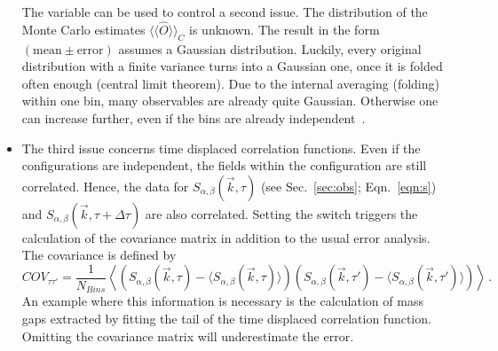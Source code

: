 \begin{itemize}
The  variable can be used to control a second issue. The distribution of the Monte Carlo estimates $\langle\langle\hat{O}\rangle\rangle_C$ is unknown. The result in the form $(\mathrm{mean}\pm \mathrm{error})$ assumes a Gaussian distribution. Luckily, every original distribution with a finite variance turns into a Gaussian one, once it is folded often enough (central limit theorem). Due to the internal averaging (folding) within one bin, many observables are already quite Gaussian. Otherwise one can increase  further, even if the bins are already independent~\cite{Bercx17}.
	\item The third issue concerns time displaced correlation functions. Even if the configurations are independent, the fields within the configuration are still correlated. Hence, the data for $S_{\alpha,\beta}(\vec{k},\tau)$ (see Sec.~\ref{sec:obs}; Eqn.~\ref{eqn:s}) and $S_{\alpha,\beta}(\vec{k},\tau+\Delta\tau)$ are also correlated. Setting the switch  triggers the calculation of the covariance matrix in addition to the usual error analysis. The covariance is defined by
	\begin{equation}
		COV_{\tau \tau'}=\frac{1}{N_{Bins}}\left\langle\left(S_{\alpha,\beta}(\vec{k},\tau)-\langle S_{\alpha,\beta}(\vec{k},\tau)\rangle\right)\left(S_{\alpha,\beta}(\vec{k},\tau')-\langle S_{\alpha,\beta}(\vec{k},\tau')\rangle\right)\right\rangle\,.
	\end{equation}
An example where this information is necessary is the  calculation of mass gaps extracted by fitting the  tail  of the time displaced correlation function.  Omitting  the covariance matrix will  underestimate the  error.
\end{itemize}
